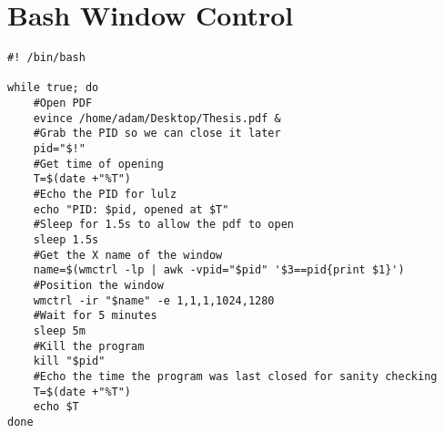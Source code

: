 \chapter{Bash Window Control}
\label{app:wmctrl}

\begin{lstlisting}
#! /bin/bash

while true; do
	#Open PDF
	evince /home/adam/Desktop/Thesis.pdf &
	#Grab the PID so we can close it later
	pid="$!"
	#Get time of opening
	T=$(date +"%T")
	#Echo the PID for lulz
	echo "PID: $pid, opened at $T"
	#Sleep for 1.5s to allow the pdf to open
	sleep 1.5s
	#Get the X name of the window
	name=$(wmctrl -lp | awk -vpid="$pid" '$3==pid{print $1}')
	#Position the window
	wmctrl -ir "$name" -e 1,1,1,1024,1280
	#Wait for 5 minutes
	sleep 5m
	#Kill the program
	kill "$pid"
	#Echo the time the program was last closed for sanity checking
	T=$(date +"%T")
	echo $T
done
\end{lstlisting}
